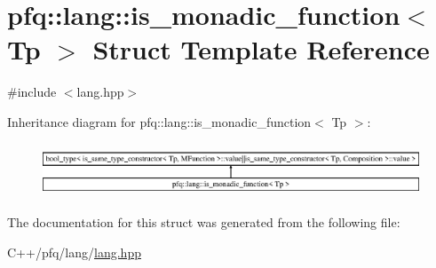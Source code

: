 \hypertarget{structpfq_1_1lang_1_1is__monadic__function}{\section{pfq\+:\+:lang\+:\+:is\+\_\+monadic\+\_\+function$<$ Tp $>$ Struct Template Reference}
\label{structpfq_1_1lang_1_1is__monadic__function}
}


{\ttfamily \#include $<$lang.\+hpp$>$}

Inheritance diagram for pfq\+:\+:lang\+:\+:is\+\_\+monadic\+\_\+function$<$ Tp $>$\+:\begin{figure}[H]
\begin{center}
\leavevmode
\includegraphics[height=1.611511cm]{structpfq_1_1lang_1_1is__monadic__function}
\end{center}
\end{figure}


The documentation for this struct was generated from the following file\+:\begin{DoxyCompactItemize}
\item 
C++/pfq/lang/\hyperlink{lang_8hpp}{lang.\+hpp}\end{DoxyCompactItemize}
